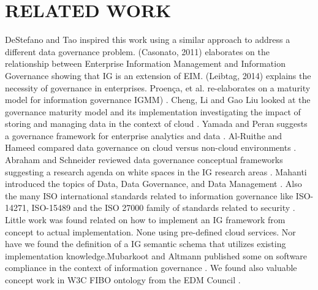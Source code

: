 \documentclass[a4paper,twoside]{article}
\begin{document}
\section{\uppercase{Related work}}
\label{sec:Relatedwork}
\cite{DeStefano2016} DeStefano and Tao inspired this work using a similar approach to address a different data governance problem. \cite{Casonato2011} (Casonato, 2011) elaborates on the relationship between Enterprise Information Management and Information Governance showing that IG is an extension of EIM. \cite{Leibtag2014}(Leibtag, 2014) explains the necessity of governance in enterprises. Proença, et al. re-elaborates on a maturity model for information governance IGMM) \cite{Proenca2018}. Cheng, Li and Gao Liu looked at the governance maturity model and its implementation investigating the impact of storing and managing data in the context of cloud \cite{Cheng2017}. Yamada and Peran suggests a governance framework for enterprise analytics and data \cite{Yamada2017}. Al-Ruithe and Hameed compared data governance on cloud versus non-cloud environments \cite{ALRuithe2018}. Abraham and Schneider reviewed data governance conceptual frameworks suggesting a research agenda on white spaces in the IG research areas \cite{Abraham2019}. Mahanti introduced the topics of Data, Data Governance, and Data Management \cite{Mahanti2021}. Also the many ISO international standards related to information governance like ISO-14271, ISO-15489 \cite{ISO15489-2016} and the ISO 27000 family of standards related to security \cite{ISO27000-2018}. Little work was found related on how to implement an IG framework from concept to actual implementation. None using pre-defined cloud services. Nor have we found the definition of a IG semantic schema that utilizes existing implementation knowledge.Mubarkoot and Altmann published some on software compliance in the context of information governance \cite{Mubarkoot2021}. We found also valuable concept work in W3C FIBO ontology from the EDM Council \cite{FIBO2020}.
%
\end{document}
